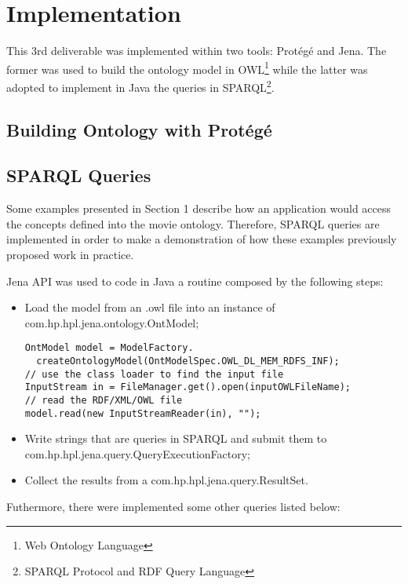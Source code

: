 \documentclass[a4paper,10pt]{article}
\begin{document}
\section{Implementation}

This 3rd deliverable was implemented within two tools: Protégé\cite{protege} and Jena\cite{jena}. The former was used to build the ontology model in OWL\footnote{Web Ontology Language} while the latter was adopted to implement in Java the queries in SPARQL\footnote{SPARQL Protocol and RDF Query Language}.

\subsection{Building Ontology with Protégé}

\subsection{SPARQL Queries}
Some examples presented in Section 1 describe how an application would access the concepts defined into the movie ontology.
Therefore, SPARQL queries are implemented in order to make a demonstration of how these examples previously proposed work in practice.

Jena API was used to code in Java a routine composed by the following steps:

\begin{itemize}
  \item Load the model from an .owl file into an instance of com.hp.hpl.jena.ontology.OntModel;
\begin{lstlisting}
OntModel model = ModelFactory.
  createOntologyModel(OntModelSpec.OWL_DL_MEM_RDFS_INF);
// use the class loader to find the input file
InputStream in = FileManager.get().open(inputOWLFileName);
// read the RDF/XML/OWL file
model.read(new InputStreamReader(in), "");
\end{lstlisting}

  \item Write strings that are queries in SPARQL and submit them to com.hp.hpl.jena.query.QueryExecutionFactory;

  \item Collect the results from a com.hp.hpl.jena.query.ResultSet.

\end{itemize}

Futhermore, there were implemented some other queries listed below:

%
\end{document}
